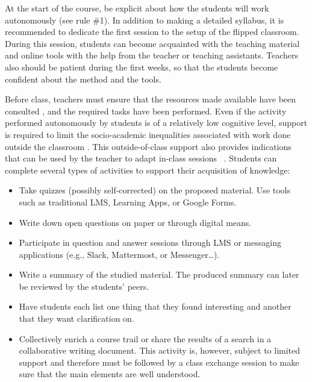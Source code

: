 \documentclass[10pt,letterpaper]{article}
\begin{document}
At the start of the course, be explicit about how the students will
work autonomously (see rule \#1). In addition to making a detailed syllabus, it is recommended to dedicate the first session to the setup of the flipped classroom. During this session, students can become acquainted with the teaching material and online tools with the help from the teacher or teaching assistants. Teachers also should be patient during the first weeks, so that the students become confident about the method and the tools.

Before class, teachers must ensure that the resources made available
have been consulted \cite{lo_critical_2017}, and the required tasks have been performed. 
Even if the activity performed autonomously by students is of a relatively low cognitive level, support is required to limit the socio-academic inequalities associated with work done outside the classroom \cite{rayou_faire_2010}. This outside-of-class support also provides indications that can be used by the teacher to adapt in-class sessions ~\cite{fidalgo2017apft}.
Students can complete several types of activities to support their acquisition of knowledge:

\begin{itemize}

\item Take quizzes (possibly self-corrected) on the proposed material. 
Use tools such as traditional LMS, Learning Apps, or Google Forms.

\item Write down open questions on paper or through digital means.

\item Participate in question and answer sessions through LMS or messaging applications (e.g., Slack, Mattermost, or Messenger\ldots).

\item Write a summary of the studied material. 
The produced summary can later be reviewed by the students’ peers.

\item Have students each list one thing that they found interesting and another that they want clarification on.

\item Collectively enrich a course trail or share the results of a search in a collaborative writing document. 
This activity is, however, subject to limited support and therefore must be followed by a class exchange session to make sure that the main elements are well understood.

\end{itemize}
\end{document}
